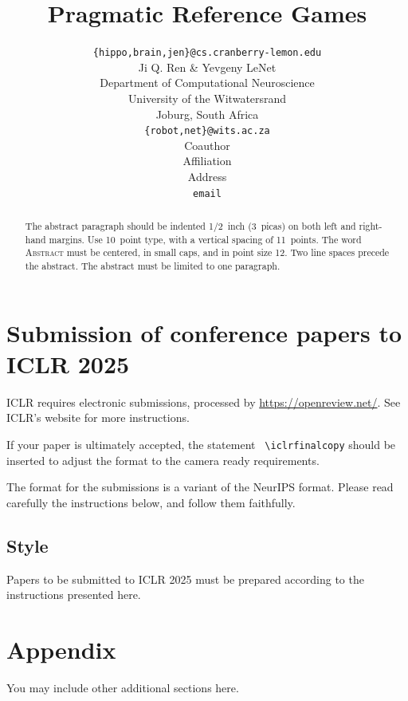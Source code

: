 \documentclass{article} %
\title{Pragmatic Reference Games}
\author{\texttt{\{hippo,brain,jen\}@cs.cranberry-lemon.edu} \\
\And
Ji Q. Ren \& Yevgeny LeNet \\
Department of Computational Neuroscience \\
University of the Witwatersrand \\
Joburg, South Africa \\
\texttt{\{robot,net\}@wits.ac.za} \\
\AND
Coauthor \\
Affiliation \\
Address \\
\texttt{email}
}
\begin{document}
\maketitle

\begin{abstract}
The abstract paragraph should be indented 1/2~inch (3~picas) on both left and
right-hand margins. Use 10~point type, with a vertical spacing of 11~points.
The word \textsc{Abstract} must be centered, in small caps, and in point size 12. Two
line spaces precede the abstract. The abstract must be limited to one
paragraph.
\end{abstract}

\section{Submission of conference papers to ICLR 2025}

ICLR requires electronic submissions, processed by
\url{https://openreview.net/}. See ICLR's website for more instructions.

If your paper is ultimately accepted, the statement {\tt
  {\textbackslash}iclrfinalcopy} should be inserted to adjust the
format to the camera ready requirements.

The format for the submissions is a variant of the NeurIPS format.
Please read carefully the instructions below, and follow them
faithfully.

\subsection{Style}

Papers to be submitted to ICLR 2025 must be prepared according to the
instructions presented here.






\appendix
\section{Appendix}
You may include other additional sections here.
\end{document}
